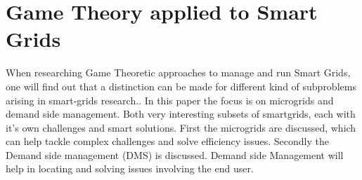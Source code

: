 \section{Game Theory applied to Smart Grids}
When researching Game Theoretic approaches to manage and run Smart Grids, one will find out that a distinction can be made for different kind of subproblems arising in smart-grids research.\cite{keypaper}. In this paper the focus is on microgrids and demand side management. Both very interesting subsets of smartgrids, each with it's own challenges and smart solutions. First the microgrids are discussed, which can help tackle complex challenges and solve efficiency issues. Secondly the Demand side management (DMS) is discussed. Demand side Management will help in locating and solving issues involving the end user. 




